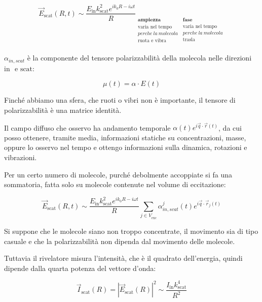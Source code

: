 \[{\overrightarrow{E}}_{\text{scat}}\left( R,t \right) \sim \frac{E_{\text{in}}k_{\text{scat}}^{2}e^{ik_{0}R - i\omega t}}{R}\underset{\begin{matrix}
\mathbf{\text{ampiezza}} \\
\text{varia\ nel\ tempo} \\
perche\ la\ molecola\  \\
\text{ruota\ e\ vibra} \\
\end{matrix}}{}\underset{\begin{matrix}
\mathbf{\text{fase}} \\
\text{varia\ nel\ tempo} \\
perche\ la\ molecola \\
\text{trasla} \\
\end{matrix}}{}\]

\(\alpha_{in,scat}\) è la componente del tensore polarizzabilità della
molecola nelle direzioni \(\text{in\ }\) e \(\text{scat}\):

\[\mu\left( t \right) = \alpha \cdot E\left( t \right)\]

Finché abbiamo una sfera, che ruoti o vibri non è importante, il tensore
di polarizzabilità è una matrice identità.

Il campo diffuso che osservo ha andamento temporale
\(\alpha\left( t \right)e^{i\overrightarrow{q} \cdot \overrightarrow{r}(t)}\),
da cui posso ottenere, tramite media, informazioni statiche su
concentrazioni, masse, oppure lo osservo nel tempo e ottengo
informazioni sulla dinamica, rotazioni e vibrazioni.

Per un certo numero di molecole, purché debolmente accoppiate si fa una
sommatoria, fatta solo su molecole contenute nel volume di eccitazione:

\[{\overrightarrow{E}}_{\text{scat}}\left( R,t \right) \sim \frac{E_{\text{in}}k_{\text{scat}}^{2}e^{ik_{0}R - i\omega t}}{R}\sum_{{j \in V}_{\text{exc}}}^{}{\alpha_{in,scat}^{j}\left( t \right)e^{i\overrightarrow{q} \cdot {\overrightarrow{r}}_{j}\left( t \right)}}\]

Si suppone che le molecole siano non troppo concentrate, il movimento
sia di tipo casuale e che la polarizzabilità non dipenda dal movimento
delle molecole.

Tuttavia il rivelatore misura l'intensità, che è il quadrato
dell'energia, quindi dipende dalla quarta potenza del vettore d'onda:

\[{\overrightarrow{I}}_{\text{scat}}\left( R \right) = \left| {\overrightarrow{E}}_{\text{scat}}\left( R \right) \right|^{2} \sim \frac{I_{\text{in}}k_{\text{scat}}^{4}}{R^{2}}\]

